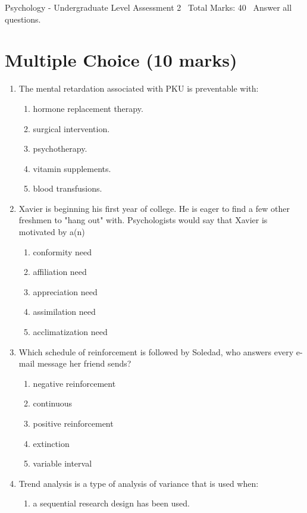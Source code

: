 \documentclass[12pt]{article}
\begin{document}
\begin{center}
Psychology - Undergraduate Level Assessment 2 \
Total Marks: 40 \
Answer all questions.
\end{center}

\section*{Multiple Choice (10 marks)}
\begin{enumerate}[label=\arabic*.]
\item The mental retardation associated with PKU is preventable with:
\begin{enumerate}[label=(\alph*)]
    \item hormone replacement therapy.
    \item surgical intervention.
    \item psychotherapy.
    \item vitamin supplements.
    \item blood transfusions.
\end{enumerate}
\item Xavier is beginning his first year of college. He is eager to find a few other freshmen to "hang out" with. Psychologists would say that Xavier is motivated by a(n)
\begin{enumerate}[label=(\alph*)]
    \item conformity need
    \item affiliation need
    \item appreciation need
    \item assimilation need
    \item acclimatization need
\end{enumerate}
\item Which schedule of reinforcement is followed by Soledad, who answers every e-mail message her friend sends?
\begin{enumerate}[label=(\alph*)]
    \item negative reinforcement
    \item continuous
    \item positive reinforcement
    \item extinction
    \item variable interval
\end{enumerate}
\item Trend analysis is a type of analysis of variance that is used when:
\begin{enumerate}[label=(\alph*)]
    \item a sequential research design has been used.

\end{enumerate}
\end{enumerate}
\end{document}
